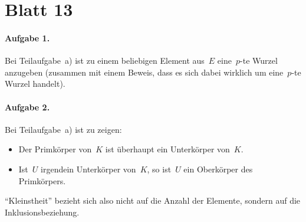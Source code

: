 \documentclass{algblatt}
\newcommand{\hint}[1]{\rotatebox{180}{\vbox{\textcolor{grey}{#1}}}}
\begin{document}
\section*{Blatt 13}

\paragraph{Aufgabe 1.} Bei Teilaufgabe~a) ist zu einem beliebigen Element
aus~$E$ eine~$p$-te Wurzel anzugeben (zusammen mit einem Beweis, dass es sich
dabei wirklich um eine~$p$-te Wurzel handelt).

\hint{%
Bei Teilaufgabe~b) ist zu zeigen: $E$ ist ein Körper und die angegebene
Abbildung ist ein Ringhomomorphismus. Wieso genügt das?
}

\paragraph{Aufgabe 2.} Bei Teilaufgabe~a) ist zu zeigen:
\begin{itemize}
\item Der Primkörper von~$K$ ist überhaupt ein Unterkörper von~$K$.
\item Ist~$U$ irgendein Unterkörper von~$K$, so ist~$U$ ein Oberkörper des
Primkörpers.
\end{itemize}
"`Kleinstheit"' bezieht sich also nicht auf die Anzahl der Elemente, sondern
auf die Inklusionsbeziehung.
\end{document}
